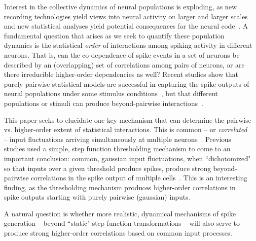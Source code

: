 \documentclass[%
 reprint,
 twocolumn,
 amsmath,amssymb,
 aps,
floatfix,
]{revtex4}
\begin{document}
Interest in the collective dynamics of neural populations is exploding, as new recording technologies yield views into neural activity on larger and larger scales~\cite{shlens, another review} and new statistical  analyses yield potential consequences for the neural code~\cite{pillow,ganmor,kass review,joel review}.  A fundamental question that arises as we seek to quantify these population dynamics is the statistical {\it order} of interactions among spiking activity in different neurons.  That is, can the co-dependence of spike events in a set of neurons be described by an (overlapping) set of correlations among pairs of neurons, or are there irreducible higher-order dependencies as well?  Recent studies show that purely pairwise statistical models are successful in capturing the spike outputs of neural populations under some stimulus conditions~\cite{schneidman06,shlens06,shlens09}, but that different populations or stimuli can produce beyond-pairwise interactions~\cite{victor,ganmor,montani,yu}.

This paper seeks to elucidate one key mechanism that can determine the pairwise vs. higher-order extent of statistical interactions.  This is common -- or {\it correlated} -- input fluctuations arriving simultaneously at multiple neurons~\cite{shadnew08,binpowers,tr08}.  Previous studies used a simple, step function thresholding mechanism to come to an important conclusion:  common, gaussian input fluctuations, when ``dichotomized" so that inputs over a given threshold produce spikes, produce strong beyond-pairwise correlations in the spike output of multiple cells~\cite{macke11,Amarietal03}.  This is an interesting finding, as the thresholding mechanism produces higher-order correlations in spike outputs starting with purely pairwise (gaussian) inputs.  

A natural question is whether more realistic, dynamical mechanisms of spike generation -- beyond ``static" step function transformations -- will also serve to produce strong higher-order correlations based on common input processes.  
\end{document}
